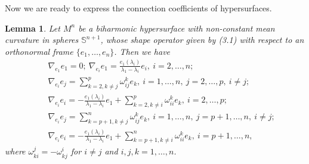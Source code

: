 \documentclass[twoside,reqno,A4]{amsart}
\newtheorem{lemma}[theorem]{Lemma}
\theoremstyle{definition}
\theoremstyle{remark}
\numberwithin{equation}{section}
\begin{document}
Now we are ready to express the connection coefficients of
hypersurfaces.
\begin{lemma}
Let $M^n$ be a biharmonic hypersurface with non-constant mean
curvature in spheres $\mathbb S^{n+1}$, whose shape operator given
by (3.1) with respect to an orthonormal frame $\{e_1, \ldots,
e_n\}$. Then we have
\begin{eqnarray*}
&&\nabla_{e_1}e_1=0;~
\nabla_{e_i}e_1=\frac{e_1(\lambda_i)}{\lambda_1-\lambda_i}e_i,~i=2,\ldots,n;\\
&&\nabla_{e_i}e_j=\sum_{k=2, k\neq j}^{p}\omega_{ij}^ke_k,
~i=1,\ldots,n,~j=2,\ldots,p,~i\neq j;\\
&&\nabla_{e_i}e_i=-\frac{e_1(\lambda_i)}{\lambda_1-\lambda_i}e_1+\sum_{k=2,
k\neq i}^{p}\omega_{ii}^ke_k,
~i=2,\ldots,p;\\
&&\nabla_{e_i}e_j=\sum_{k=p+1, k\neq j}^{n}\omega_{ij}^ke_k,
~i=1,\ldots,n,~j=p+1,\ldots,n,~i\neq j;\\
&&\nabla_{e_i}e_i=-\frac{e_1(\lambda_i)}{\lambda_1-\lambda_i}e_1+\sum_{k=p+1,
k\neq i}^{n}\omega_{ii}^ke_k, ~i=p+1,\ldots,n,
\end{eqnarray*}
where $\omega_{ki}^j=-\omega_{kj}^i$ for $i\neq j$ and $i, j,
k=1,\ldots, n$.
\end{lemma}
\end{document}
